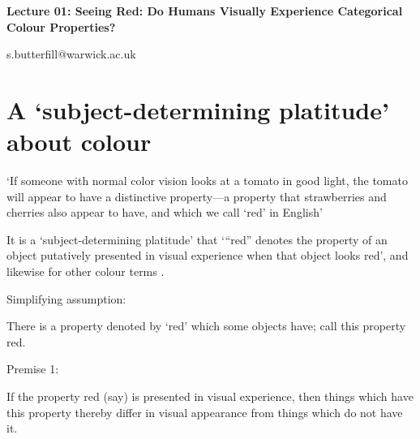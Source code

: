 \documentclass[12pt]{extarticle}
\date{}
\makeatletter
\def \ititle {Origins of Mind}
\def \iemail{s.butterfill@warwick.ac.uk}
\makeatother
\begin{document}
\begin{multicols*}{3}

\setlength\footnotesep{1em}













\def \ititle {Lecture 01: Seeing Red: Do Humans Visually Experience Categorical Colour Properties?}

\begin{center}

{\Large

\textbf{\ititle}

}



\iemail %

\end{center}



\section{A ‘subject-determining platitude’ about colour}

‘If someone with normal color vision looks at a tomato in good light, the tomato will appear to have a distinctive property—a property that strawberries and cherries also appear to have, and which we call ‘red’ in English’ \citep[p.\ 4]{byrne:2003_color}

It is a ‘subject-determining platitude’
that ‘“red” denotes the property of an object putatively presented in visual experience
when that object looks red’, and likewise for other colour terms
\citep[pp.\ 199--200]{Jackson:1996zz}.

Simplifying assumption:



There is a property denoted by ‘red’ which some objects have;  call this property   red.


Premise 1:



If the property red (say) is presented in visual experience, then things which have this property  thereby differ in  visual appearance from things which do not have it.



\end{multicols*}
\end{document}
